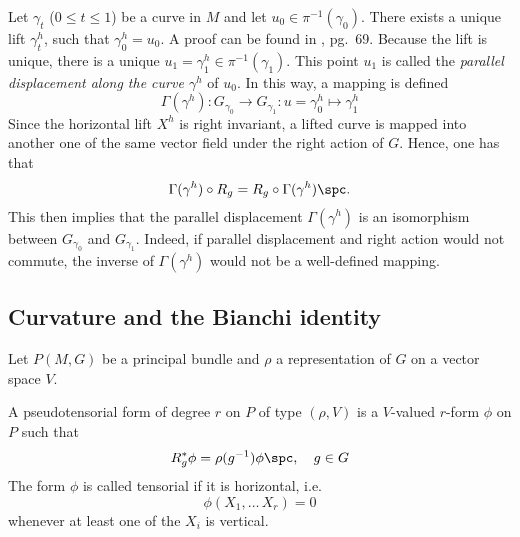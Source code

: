 \documentclass[10pt,reqno]{amsart}
\numberwithin{equation}{section}
\begin{document}
Let $\gamma_t$ ($0 \leq t \leq 1$) be a curve in $M$ and let $u_0 
\in \pi^{-1}(\gamma_0)$. There exists a unique lift $\gamma_t^h$, 
such that $\gamma^h_0 = u_0$. A proof can be found in 
\cite{kob1996found}, pg.\ 69. Because the lift is unique, there 
is a unique $u_1 = \gamma^h_1 \in \pi^{-1}(\gamma_1)$. This point 
$u_1$ is called the \emph{parallel displacement along the curve 
	$\gamma^h$} of $u_0$. In this way, a mapping is defined
%
\begin{equation}
	\Gamma(\gamma^h) : G_{\gamma_0} \rightarrow G_{\gamma_1} : u = 
	\gamma^h_0 \mapsto \gamma^h_1
\end{equation}
%
Since the horizontal lift $X^h$ is right invariant, a lifted 
curve is mapped into another one of the same vector field under 
the right action of $G$. Hence, one has that
%
\begin{equation}
	\Gamma(\gamma^h) \circ R_g = R_g \circ \Gamma(\gamma^h)\spc.
\end{equation}
%
This then implies that the parallel displacement 
$\Gamma(\gamma^h)$ is an isomorphism between $G_{\gamma_0}$ and 
$G_{\gamma_1}$. Indeed, if parallel displacement and right action 
would not commute, the inverse of $\Gamma(\gamma^h)$ would not be 
a well-defined mapping.

\subsection{Curvature and the Bianchi identity}

Let $P(M,G)$ be a principal bundle and $\rho$ a representation of 
$G$ on a vector space $V$.
%
\begin{definition}
	A pseudotensorial form of degree $r$ on $P$ of type $(\rho,V)$ 
	is a $V$-valued $r$-form $\phi$ on $P$ such that
	\begin{equation}
		R_g^\ast \phi = \rho(g^{-1}) \phi \spc, \quad g \in G
	\end{equation}
	The form $\phi$ is called tensorial if it is horizontal, i.e.\
	\begin{equation}
		\phi(X_1,\ldots\,X_r) = 0
	\end{equation}
	whenever at least one of the $X_i$ is vertical.
\end{definition}
%
\end{document}
